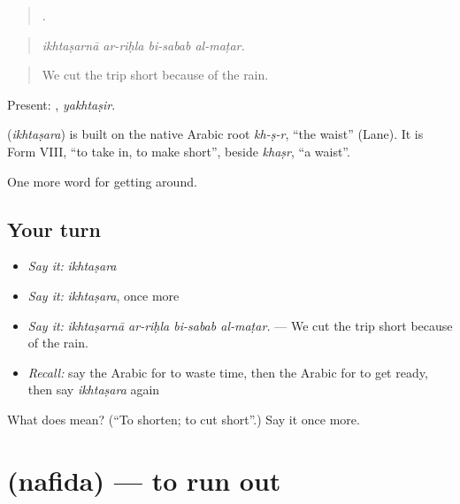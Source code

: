 \begin{quote}
   .
\end{quote}

\begin{quote}
\emph{ikhtaṣarnā ar-riḥla bi-sabab al-maṭar.}
\end{quote}

\begin{quote}
We cut the trip short because of the rain.
\end{quote}

Present: , \emph{yakhtaṣir}.

\begin{cousinweb}
\textbf{} (\emph{ikhtaṣara}) is built on the native Arabic root \emph{kh-ṣ-r}, \textquotedblleft{}the waist\textquotedblright{} (Lane). It is Form VIII, \textquotedblleft{}to take in, to make short\textquotedblright{}, beside \emph{khaṣr}, \textquotedblleft{}a waist\textquotedblright{}.
\end{cousinweb}

\begin{grammarlens}[title={What you've built}]
One more word for getting around.
\end{grammarlens}

\subsection*{Your turn}
\begin{itemize}
\raggedright
  \item \emph{Say it:} \emph{ikhtaṣara}
  \item \emph{Say it:} \emph{ikhtaṣara}, once more
  \item \emph{Say it:} \emph{ikhtaṣarnā ar-riḥla bi-sabab al-maṭar.} — We cut the trip short because of the rain.
  \item \emph{Recall:} say the Arabic for to waste time, then the Arabic for to get ready, then say \emph{ikhtaṣara} again
\end{itemize}

\begin{tcolorbox}[breakable,colback=teal!4,colframe=teal!35!black,title={Before you move on}]
What does  mean? (\textquotedblleft{}To shorten; to cut short\textquotedblright{}.) Say it once more.
\end{tcolorbox}
\section[\texorpdfstring{\ar{نفد} (nafida)}{نفد (nafida)}]{ (nafida) — to run out}

